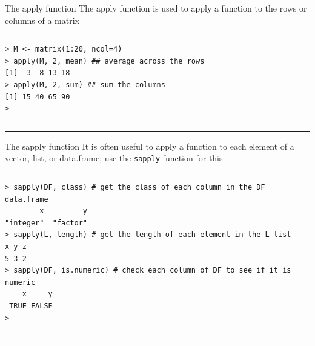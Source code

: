 \documentclass[table,smaller]{beamer}
\begin{document}
\begin{frame}[fragile,label=sec-4-1]{The apply function}
 The apply function is used to apply a function to the rows or columns of a matrix
\vspace{-.5em}
\begin{columns}
\begin{block}{}
\begin{verbatim}
> M <- matrix(1:20, ncol=4)
> apply(M, 2, mean) ## average across the rows
[1]  3  8 13 18
> apply(M, 2, sum) ## sum the columns
[1] 15 40 65 90
>
\end{verbatim}
\end{block}
\end{columns}
\vspace{.5em}

\rule{\linewidth}{0.5pt}
\end{frame}
\begin{frame}[fragile,label=sec-4-2]{The sapply function}
 It is often useful to apply a function to each element of a vector, list, or data.frame; use the \texttt{sapply} function for this

\vspace{-.5em}
\begin{columns}
\begin{block}{}
\begin{verbatim}
> sapply(DF, class) # get the class of each column in the DF data.frame
        x         y 
"integer"  "factor" 
> sapply(L, length) # get the length of each element in the L list
x y z 
5 3 2 
> sapply(DF, is.numeric) # check each column of DF to see if it is numeric
    x     y 
 TRUE FALSE 
>
\end{verbatim}
\end{block}
\end{columns}
\vspace{.5em}

\rule{\linewidth}{0.5pt}
\end{frame}
\end{document}
